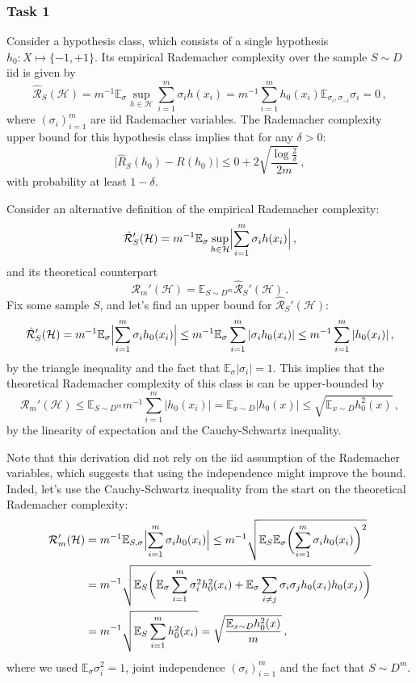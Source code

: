 \documentclass[a4paper]{article}
\newcommand{\ex}{\mathbb{E}}
\newcommand{\Hcal}{\mathcal{H}}
\begin{document}
\subsubsection{Task 1} %
\label{ssub:task_2a1}

Consider a hypothesis class, which consists of a single hypothesis $h_0:X\mapsto\{-1,+1\}$.
Its empirical Rademacher complexity over the sample $S \sim D$ iid is given by
\[ \hat{\mathcal{R}}_S(\Hcal)
    = m^{-1} \ex_\sigma \sup_{h\in \Hcal} \sum_{i=1}^m \sigma_i h(x_i)
    = m^{-1} \sum_{i=1}^m h_0(x_i) \ex_{\sigma_i, \sigma_{-i}} \sigma_i
    = 0
  \,, \]
where $(\sigma_i)_{i=1}^m$ are iid Rademacher variables. The Rademacher complexity
upper bound for this hypothesis class implies that for any $\delta > 0$:
\[ \bigl|\hat{R}_S(h_0) - R(h_0)\bigr|  
    \leq 0 + 2 \sqrt{\frac{\log\frac{2}{\delta}}{2m}}
    \,, \]
with probability at least $1-\delta$.

Consider an alternative definition of the empirical Rademacher complexity:
\[ \hat{\mathcal{R}}_S'(\Hcal)
    = m^{-1} \ex_\sigma \sup_{h\in \Hcal}
        \Bigl| \sum_{i=1}^m \sigma_i h(x_i) \Bigr|
    \,, \]
and its theoretical counterpart 
\[ \mathcal{R}_m'(\Hcal) = \ex_{S\sim D^m} \hat{\mathcal{R}}_S'(\Hcal)
  \,. \]
Fix some sample $S$, and let's find an upper bound for $\hat{\mathcal{R}}_S'(\Hcal)$:
\[ \hat{\mathcal{R}}_S'(\Hcal)
    = m^{-1} \ex_\sigma \Bigl| \sum_{i=1}^m \sigma_i h_0(x_i) \Bigr|
    \leq m^{-1} \ex_\sigma \sum_{i=1}^m | \sigma_i h_0(x_i) |
    \leq m^{-1} \sum_{i=1}^m |h_0(x_i)|
    \,, \]
by the triangle inequality and the fact that $\ex_\sigma |\sigma_i| = 1$.
This implies that the theoretical Rademacher complexity of this class is can be
upper-bounded by
\[ \mathcal{R}_m'(\Hcal)
  \leq \ex_{S\sim D^m} m^{-1} \sum_{i=1}^m |h_0(x_i)|
  = \ex_{x\sim D} |h_0(x)|
  \leq \sqrt{\ex_{x\sim D} h_0^2(x)}
  \,, \]
by the linearity of expectation and the Cauchy-Schwartz inequality.

Note that this derivation did not rely on the iid assumption of the Rademacher variables,
which suggests that using the independence might improve the bound. Inded, let's
use the Cauchy-Schwartz inequality from the start on the theoretical Rademacher
complexity:
\begin{align*}
  \mathcal{R}_m'(\Hcal)
    &= m^{-1} \ex_{S, \sigma} \Bigl| \sum_{i=1}^m \sigma_i h_0(x_i) \Bigr|
    \leq m^{-1} \sqrt{\ex_S \ex_\sigma \biggl( \sum_{i=1}^m \sigma_i h_0(x_i)\biggr)^2 } \\
    &= m^{-1} \sqrt{\ex_S \biggl(
         \ex_\sigma \sum_{i=1}^m \sigma_i^2 h_0^2(x_i)
        +  \ex_\sigma \sum_{i\neq j} \sigma_i\sigma_j h_0(x_i) h_0(x_j)
      \biggr) } \\
    &= m^{-1} \sqrt{\ex_S \sum_{i=1}^m h_0^2(x_i)}
    = \sqrt{\frac{\ex_{x\sim D} h_0^2(x)}{m}} \,,
\end{align*}
where we used $\ex_\sigma \sigma_i^2 = 1$, joint independence $(\sigma_i)_{i=1}^m$
and the fact that $S\sim D^m$.
\end{document}
